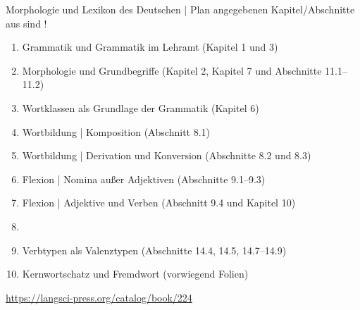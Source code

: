 \begin{frame}
  {Morphologie und Lexikon des Deutschen | Plan}
   angegebenen Kapitel\slash Abschnitte aus  sind !\\
  \Halbzeile
  \begin{enumerate}
    \item Grammatik und Grammatik im Lehramt (Kapitel 1 und 3)
    \item Morphologie und Grundbegriffe (Kapitel 2, Kapitel 7 und Abschnitte 11.1--11.2)
    \item Wortklassen als Grundlage der Grammatik (Kapitel 6)
    \item Wortbildung | Komposition (Abschnitt 8.1)
    \item Wortbildung | Derivation und Konversion (Abschnitte 8.2 und 8.3)
    \item Flexion | Nomina außer Adjektiven (Abschnitte 9.1--9.3)
    \item Flexion | Adjektive und Verben (Abschnitt 9.4 und Kapitel 10)
    \item {}
    \item Verbtypen als Valenztypen (Abschnitte 14.4, 14.5, 14.7--14.9) 
    \item Kernwortschatz und Fremdwort (vorwiegend Folien)
  \end{enumerate}
  \Halbzeile
  \centering 
  \url{https://langsci-press.org/catalog/book/224}
\end{frame}


